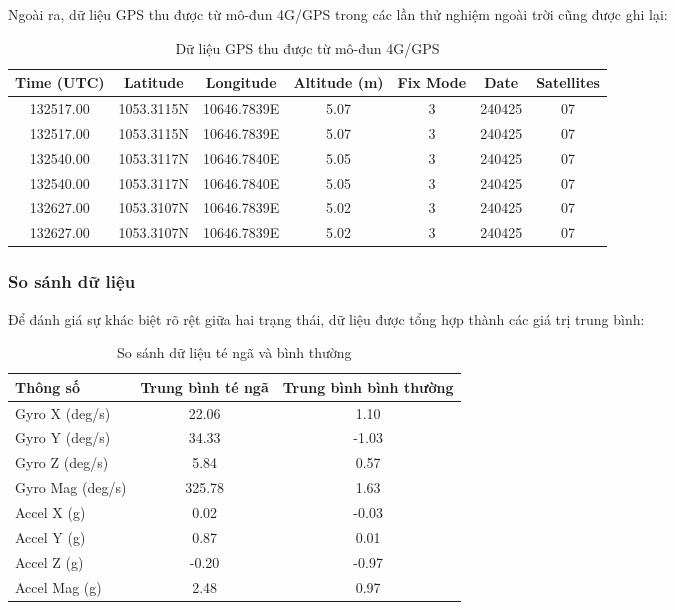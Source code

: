 Ngoài ra, dữ liệu GPS thu được từ mô-đun 4G/GPS trong các lần thử nghiệm ngoài trời cũng được ghi lại:

\begin{table}[h]
\centering
\caption{Dữ liệu GPS thu được từ mô-đun 4G/GPS}
\label{tab:gps_data}
\begin{tabular}{|c|c|c|c|c|c|c|}
\hline
\textbf{Time (UTC)} & \textbf{Latitude} & \textbf{Longitude} & \textbf{Altitude (m)} & \textbf{Fix Mode} & \textbf{Date} & \textbf{Satellites} \\
\hline
132517.00 & 1053.3115N & 10646.7839E & 5.07 & 3 & 240425 & 07 \\
132517.00 & 1053.3115N & 10646.7839E & 5.07 & 3 & 240425 & 07 \\
132540.00 & 1053.3117N & 10646.7840E & 5.05 & 3 & 240425 & 07 \\
132540.00 & 1053.3117N & 10646.7840E & 5.05 & 3 & 240425 & 07 \\
132627.00 & 1053.3107N & 10646.7839E & 5.02 & 3 & 240425 & 07 \\
132627.00 & 1053.3107N & 10646.7839E & 5.02 & 3 & 240425 & 07 \\
\hline
\end{tabular}
\end{table}

\subsubsection*{So sánh dữ liệu}
Để đánh giá sự khác biệt rõ rệt giữa hai trạng thái, dữ liệu được tổng hợp thành các giá trị trung bình:

\begin{table}[h]
\centering
\caption{So sánh dữ liệu té ngã và bình thường}
\label{tab:comparison}
\begin{tabular}{|l|c|c|}
\hline
\textbf{Thông số} & \textbf{Trung bình té ngã} & \textbf{Trung bình bình thường} \\
\hline
Gyro X (deg/s) & 22.06 & 1.10 \\
Gyro Y (deg/s) & 34.33 & -1.03 \\
Gyro Z (deg/s) & 5.84  & 0.57 \\
Gyro Mag (deg/s) & 325.78 & 1.63 \\
Accel X (g)   & 0.02  & -0.03 \\
Accel Y (g)   & 0.87  & 0.01 \\
Accel Z (g)   & -0.20 & -0.97 \\
Accel Mag (g) & 2.48  & 0.97 \\
\hline
\end{tabular}
\end{table}

